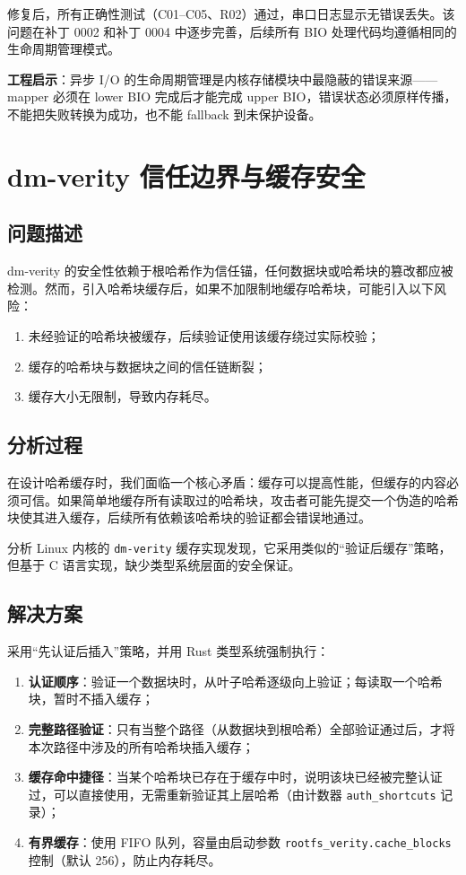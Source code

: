 修复后，所有正确性测试（C01--C05、R02）通过，串口日志显示无错误丢失。该问题在补丁 0002 和补丁 0004 中逐步完善，后续所有 BIO 处理代码均遵循相同的生命周期管理模式。

\textbf{工程启示}：异步 I/O 的生命周期管理是内核存储模块中最隐蔽的错误来源——mapper 必须在 lower BIO 完成后才能完成 upper BIO，错误状态必须原样传播，不能把失败转换为成功，也不能 fallback 到未保护设备。

\section{dm-verity 信任边界与缓存安全}

\subsection{问题描述}

dm-verity 的安全性依赖于根哈希作为信任锚，任何数据块或哈希块的篡改都应被检测。然而，引入哈希块缓存后，如果不加限制地缓存哈希块，可能引入以下风险：
\begin{enumerate}
    \item 未经验证的哈希块被缓存，后续验证使用该缓存绕过实际校验；
    \item 缓存的哈希块与数据块之间的信任链断裂；
    \item 缓存大小无限制，导致内存耗尽。
\end{enumerate}

\subsection{分析过程}

在设计哈希缓存时，我们面临一个核心矛盾：缓存可以提高性能，但缓存的内容必须可信。如果简单地缓存所有读取过的哈希块，攻击者可能先提交一个伪造的哈希块使其进入缓存，后续所有依赖该哈希块的验证都会错误地通过。

分析 Linux 内核的 \texttt{dm-verity} 缓存实现发现，它采用类似的“验证后缓存”策略，但基于 C 语言实现，缺少类型系统层面的安全保证。

\subsection{解决方案}

采用“先认证后插入”策略，并用 Rust 类型系统强制执行：

\begin{enumerate}
    \item \textbf{认证顺序}：验证一个数据块时，从叶子哈希逐级向上验证；每读取一个哈希块，暂时不插入缓存；
    \item \textbf{完整路径验证}：只有当整个路径（从数据块到根哈希）全部验证通过后，才将本次路径中涉及的所有哈希块插入缓存；
    \item \textbf{缓存命中捷径}：当某个哈希块已存在于缓存中时，说明该块已经被完整认证过，可以直接使用，无需重新验证其上层哈希（由计数器 \texttt{auth\_shortcuts} 记录）；
    \item \textbf{有界缓存}：使用 FIFO 队列，容量由启动参数 \texttt{rootfs\_verity.cache\_blocks} 控制（默认 256），防止内存耗尽。
\end{enumerate}

